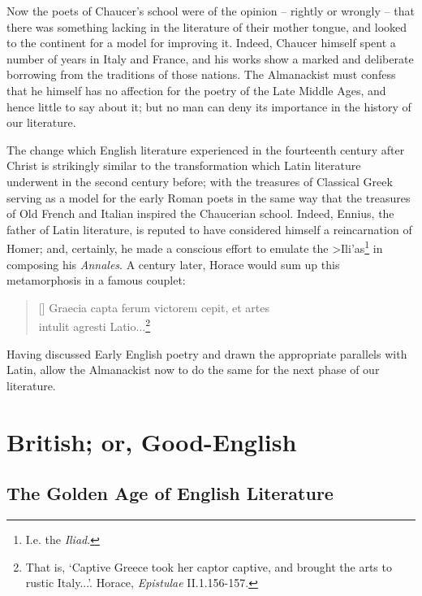 \documentclass[0main.tex]{subfiles}
\begin{document}
Now the poets of Chaucer's school were of the opinion -- rightly or wrongly -- that there was something lacking in the literature of their mother tongue, and looked to the continent for a model for improving it. Indeed, Chaucer himself spent a number of years in Italy and France, and his works show a marked and deliberate borrowing from the traditions of those nations. The Almanackist must confess that he himself has no affection for the poetry of the Late Middle Ages, and hence little to say about it; but no man can deny its importance in the history of our literature.

The change which English literature experienced in the fourteenth century after Christ is strikingly similar to the transformation which Latin literature underwent in the second century before; with the treasures of Classical Greek serving as a model for the early Roman poets in the same way that the treasures of Old French and Italian inspired the Chaucerian school. Indeed, Ennius, the father of Latin literature, is reputed to have considered himself a reincarnation of Homer; and, certainly, he made a conscious effort to emulate the {\greektext >Ili'as}\footnote{I.e. the \emph{Iliad}.} in composing his \emph{Annales}. A century later, Horace would sum up this metamorphosis in a famous couplet:\\

\settowidth{\versewidth}{\footnotesize Graecia capta ferum victorem cepit, et artes}
\begin{verse}[\versewidth]
{\footnotesize
\vin Graecia capta ferum victorem cepit, et artes\\
intulit agresti Latio...\footnote{That is, `Captive Greece took her captor captive, and brought the arts to rustic Italy...'. Horace, \emph{Epistulae} II.1.156-157.}\\
}
\end{verse}

\bigskip

Having discussed Early English poetry and drawn the appropriate parallels with Latin, allow the Almanackist now to do the same for the next phase of our literature.

\bigskip

\section{British; or, Good-English}

\subsection{The Golden Age of English Literature}
\end{document}

